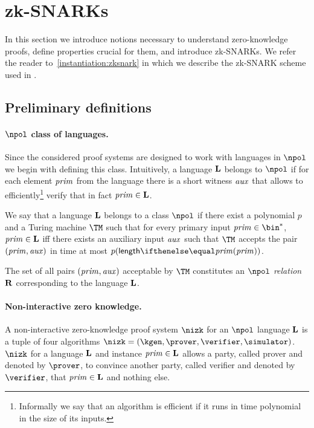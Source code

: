 
\section{zk-SNARKs}\label{preliminaries:zk-snark}

In this section we introduce notions necessary to understand zero-knowledge proofs, define properties crucial for them, and introduce zk-SNARKs.
We refer the reader to~\cref{instantiation:zksnark} in which we describe the zk-SNARK scheme used in \zeth{}.

\subsection{Preliminary definitions}

\paragraph{$\npol$ class of languages.}
Since the considered proof systems are designed to work with languages in $\npol$ we begin with defining this class. Intuitively, a language $\mathbf{L}$ belongs to $\npol$ if for each element $\mathit{prim}$ from the language there is a short witness $\mathit{aux}$ that allows to efficiently\footnote{Informally we say that an algorithm is efficient if it runs in time polynomial in the size of its inputs.} verify that in fact $\mathit{prim} \in \mathbf{L}$.

\begin{definition}
  We say that a language $\mathbf{L}$ belongs to a class $\npol$ if there exist a polynomial $p$ and a Turing machine $\TM$ such that for every primary input $\priminputs \in \bin^{*}$, $\mathit{prim} \in \mathbf{L}$ iff there exists an auxiliary input $\mathit{aux}$ such that $\TM$ accepts the pair $(\mathit{prim}, \mathit{aux})$ in time at most $p(\len {\priminputs})$.

  The set of all pairs $(\mathit{prim}, \mathit{aux})$ acceptable by $\TM$ constitutes an \emph{$\npol$ relation} $\mathbf{R}$ corresponding to the language $\mathbf{L}$.
\end{definition}

\paragraph{Non-interactive zero knowledge.}
A non-interactive zero-knowledge proof system $\nizk$ for an $\npol$ language $\mathbf{L}$ is a tuple of four algorithms $\nizk = (\kgen, \prover, \verifier, \simulator)$. $\nizk$ for a language $\mathbf{L}$ and instance $\mathit{prim} \in \mathbf{L}$ allows a party, called prover and denoted by $\prover$, to convince another party, called verifier and denoted by $\verifier$, that $\mathit{prim} \in \mathbf{L}$ and nothing else.

